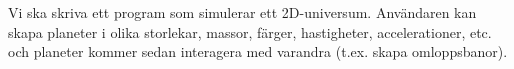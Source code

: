 Vi ska skriva ett program som simulerar ett 2D-universum.
Användaren kan skapa planeter i olika
storlekar, massor, färger, hastigheter, accelerationer, etc.
och planeter kommer sedan interagera med varandra (t.ex. skapa omloppsbanor).


